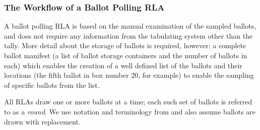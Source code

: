 \subsubsection{The Workflow of a Ballot Polling RLA}
\label{sec:polling}
A ballot polling RLA \cite{RLA} is based on the manual examination of the sampled ballots, and does not require any information from the tabulating system other than the tally. 
More detail about the storage of ballots is required, however: a complete ballot manifest (a list of ballot storage containers and the number of ballots in each) which enables the creation of a well defined list of the ballots and their locations (the fifth ballot in box number 20, for example) to enable the sampling of specific ballots from the list. 

All RLAs draw one or more ballots at a time; each such set of ballots is referred to as a {\em round}. We use notation and terminology from \cite{usenix_minerva,arxiv_athena,simulations,bravo} and also assume ballots are drawn with replacement. 

